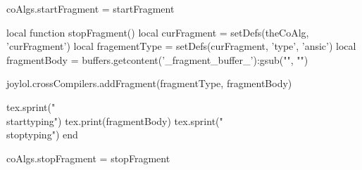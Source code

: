 coAlgs.startFragment = startFragment

local function stopFragment()
  local curFragment   = setDefs(theCoAlg, 'curFragment')
  local fragementType = setDefs(curFragment, 'type', 'ansic')
  local fragmentBody  = buffers.getcontent('_fragment_buffer_'):gsub("", "\n")

  joylol.crossCompilers.addFragment(fragmentType, fragmentBody)

  tex.sprint("\\starttyping")
  tex.print(fragmentBody)
  tex.sprint("\\stoptyping")
end

coAlgs.stopFragment = stopFragment
\stopLuaCode

\stopTestSuite
